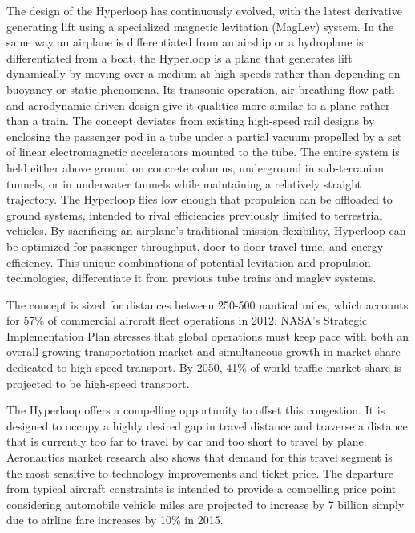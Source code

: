 	The design of the Hyperloop has continuously evolved, with the latest derivative
	generating lift using a specialized magnetic levitation (MagLev) system.
	In the same way an airplane is differentiated from an airship or a hydroplane is differentiated from
	a boat, the Hyperloop is a plane that generates lift dynamically
	by moving over a medium at high-speeds
	rather than depending on buoyancy or static phenomena.
	Its transonic operation, air-breathing flow-path and aerodynamic
	driven design give it qualities more similar to a plane rather than a train.
	The concept deviates from existing high-speed rail designs by enclosing the passenger pod in a tube under a partial vacuum
	propelled by a set of linear electromagnetic accelerators
	mounted to the tube. The entire system is held either above ground on concrete
	columns, underground in sub-terranian tunnels, or in underwater tunnels while maintaining a relatively straight trajectory.
	The Hyperloop flies low enough that propulsion can be offloaded to ground systems,
	intended to rival efficiencies previously limited to terrestrial vehicles.
	By sacrificing an airplane's traditional mission flexibility,
	Hyperloop can be optimized for passenger throughput, door-to-door travel time,
	and energy efficiency.
	This unique combinations of potential levitation and propulsion technologies,
	differentiate it from previous tube trains and maglev systems.

	The concept is sized for distances between 250-500 nautical miles,
	which accounts for 57\% of commercial aircraft fleet operations in 2012. NASA's
	Strategic Implementation Plan stresses that global operations must keep pace with both an overall growing
	transportation market and simultaneous growth in market share dedicated to high-speed transport.
	By 2050, 41\% of world traffic market share is projected to be high-speed transport. \cite{Schafer}

	The Hyperloop offers a compelling opportunity to offset this congestion.
	It is designed to occupy a highly desired gap in travel distance and traverse a distance
	that is currently too far to travel by car and too short to travel by plane. Aeronautics market
	research also shows that demand for this travel segment is the most sensitive to
	technology improvements and ticket price.\cite{H. Baik} The departure from typical aircraft constraints
	is intended to provide a compelling price point considering automobile vehicle miles are
	projected to increase by 7 billion simply due to airline
	fare increases by 10\% in 2015.

